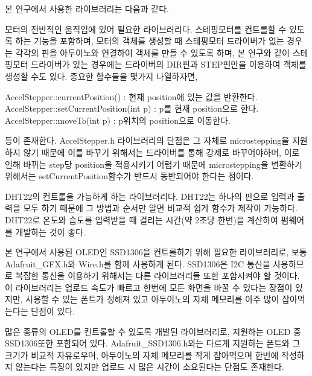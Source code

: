 본 연구에서 사용한 라이브러리는 다음과 같다. 
\begin{description}[font=$\bullet$~\normalfont\scshape\color{red!50!black}]
	\item [AccelStepper.h] 모터의 전반적인 움직임에 있어 필요한 라이브러리다. 스테핑모터를 컨트롤할 수 있도록 하는 기능을 포함하며, 모터의 객체를 생성할 때 스테핑모터 드라이버가 없는 경우는 각각의 핀을 아두이노와 연결하여 객체를 만들 수 있도록 하며, 본 연구와 같이 스테핑모터 드라이버가 있는 경우에는 드라이버의 DIR핀과 STEP핀만을 이용하여 객체를 생성할 수도 있다. 중요한 함수들을 몇가지 나열하자면, 
	
	AccelStepper::currentPosition() : 현재 position에 있는 값을 반환한다.\\
	AccelStepper::setCurrentPosition(int p) : p를 현재 position으로 한다.\\
	AccelStepper::moveTo(int p) : p위치의 position으로 이동한다.
	
	등이 존재한다. AccelStepper.h 라이브러리의 단점은 그 자체로 microstepping을 지원하지 않기 때문에 이를 바꾸기 위해서는 드라이버를 통해 강제로 바꾸어야하며, 이로 인해 바뀌는 step당 position을 적용시키기 어렵기 때문에 microstepping을 변환하기 위해서는 setCurrentPosition함수가 반드시 동반되어야 한다는 점이다.
	
	\item [DHT.h] DHT22의 컨트롤을 가능하게 하는 라이브러리다. DHT22는 하나의 핀으로 입력과 출력을 모두 하기 때문에 그 방법과 순서만 알면 비교적 쉽게 함수가 제작이 가능하다. DHT22로 온도와 습도를 입력받을 때 걸리는 시간(약 2초당 한번)을 계산하여 펌웨어를 개발하는 것이 좋다.
	
	\item [Adafruit\_SSD1306.h] 본 연구에서 사용된 OLED인 SSD1306을 컨트롤하기 위해 필요한 라이브러리로, 보통 Adafruit\_GFX.h와 Wire.h를 함께 사용하게 된다. SSD1306은 I2C 통신을 사용하므로 복잡한 통신을 이용하기 위해서는 다른 라이브러리들 또한 포함시켜야 할 것이다. 이 라이브러리는 업로드 속도가 빠르고 한번에 모든 화면을 바꿀 수 있다는 장점이 있지만, 사용할 수 있는 폰트가 정해져 있고 아두이노의 자체 메모리를 아주 많이 잡아먹는다는 단점이 있다.
	
	\item [U8glib.h] 많은 종류의 OLED를 컨트롤할 수 있도록 개발된 라이브러리로, 지원하는 OLED 중 SSD1306또한 포함되어 있다. Adafruit\_SSD1306.h와는 다르게 지원하는 폰트와 그 크기가 비교적 자유로우며, 아두이노의 자체 메모리를 작게 잡아먹으며 한번에 작성하지 않는다는 특징이 있지만 업로드 시 많은 시간이 소요된다는 단점도 존재한다.
\end{description}

